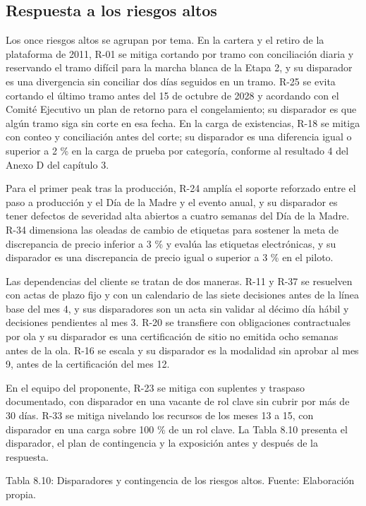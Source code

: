\documentclass[11pt]{article}
\begin{document}
\subsection{Respuesta a los riesgos altos}

Los once riesgos altos se agrupan por tema. En la cartera y el retiro de la plataforma de 2011, R-01 se mitiga cortando por tramo con conciliación diaria y reservando el tramo difícil para la marcha blanca de la Etapa 2, y su disparador es una divergencia sin conciliar dos días seguidos en un tramo. R-25 se evita cortando el último tramo antes del 15 de octubre de 2028 y acordando con el Comité Ejecutivo un plan de retorno para el congelamiento; su disparador es que algún tramo siga sin corte en esa fecha. En la carga de existencias, R-18 se mitiga con conteo y conciliación antes del corte; su disparador es una diferencia igual o superior a 2 \% en la carga de prueba por categoría, conforme al resultado 4 del Anexo D del capítulo 3.

Para el primer peak tras la producción, R-24 amplía el soporte reforzado entre el paso a producción y el Día de la Madre y el evento anual, y su disparador es tener defectos de severidad alta abiertos a cuatro semanas del Día de la Madre. R-34 dimensiona las oleadas de cambio de etiquetas para sostener la meta de discrepancia de precio inferior a 3 \% y evalúa las etiquetas electrónicas, y su disparador es una discrepancia de precio igual o superior a 3 \% en el piloto.

Las dependencias del cliente se tratan de dos maneras. R-11 y R-37 se resuelven con actas de plazo fijo y con un calendario de las siete decisiones antes de la línea base del mes 4, y sus disparadores son un acta sin validar al décimo día hábil y decisiones pendientes al mes 3. R-20 se transfiere con obligaciones contractuales por ola y su disparador es una certificación de sitio no emitida ocho semanas antes de la ola. R-16 se escala y su disparador es la modalidad sin aprobar al mes 9, antes de la certificación del mes 12.

En el equipo del proponente, R-23 se mitiga con suplentes y traspaso documentado, con disparador en una vacante de rol clave sin cubrir por más de 30 días. R-33 se mitiga nivelando los recursos de los meses 13 a 15, con disparador en una carga sobre 100 \% de un rol clave. La Tabla 8.10 presenta el disparador, el plan de contingencia y la exposición antes y después de la respuesta.

Tabla 8.10: Disparadores y contingencia de los riesgos altos. Fuente: Elaboración propia.\label{tab:8-10}
\end{document}
